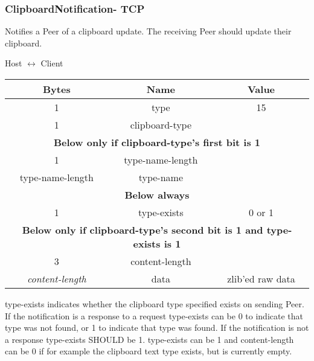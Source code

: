\subsubsection{ClipboardNotification- TCP}

Notifies a Peer of a clipboard update. The receiving Peer should update their clipboard.

\begin{center}
    Host $\leftrightarrow$ Client\\
    \begin{tabular}{|c|c|c|}
        \hline
        \textbf{Bytes}        & \textbf{Name}    & \textbf{Value}   \\
        \hline
        1                     & type             & 15               \\
        \hline
        1                     & clipboard-type   &                  \\
        \hline
        \multicolumn{3}{|c|}{\textbf{Below only if clipboard-type's first bit is 1} } \\
        \hline
        1                     & type-name-length &                  \\
        \hline
        type-name-length      & type-name        &                  \\
        \hline
        \multicolumn{3}{|c|}{\textbf{Below always} } \\
        \hline
        1                     & type-exists      & 0 or 1           \\
        \hline
        \multicolumn{3}{|c|}{\textbf{Below only if clipboard-type's second bit is 1 and type-exists is 1} }
        \\
        \hline
        3 & content-length             & \\
        \hline
        \emph{content-length} & data             & zlib'ed raw data \\
        \hline
    \end{tabular}
\end{center}

type-exists indicates whether the clipboard type specified exists on sending Peer.
If the notification is a response to a request type-exists can be 0 to indicate that type was not found, or 1 to indicate that type was found.
If the notification is not a response type-exists SHOULD be 1.
type-exists can be 1 and content-length can be 0 if for example the clipboard text type exists, but is currently empty.

